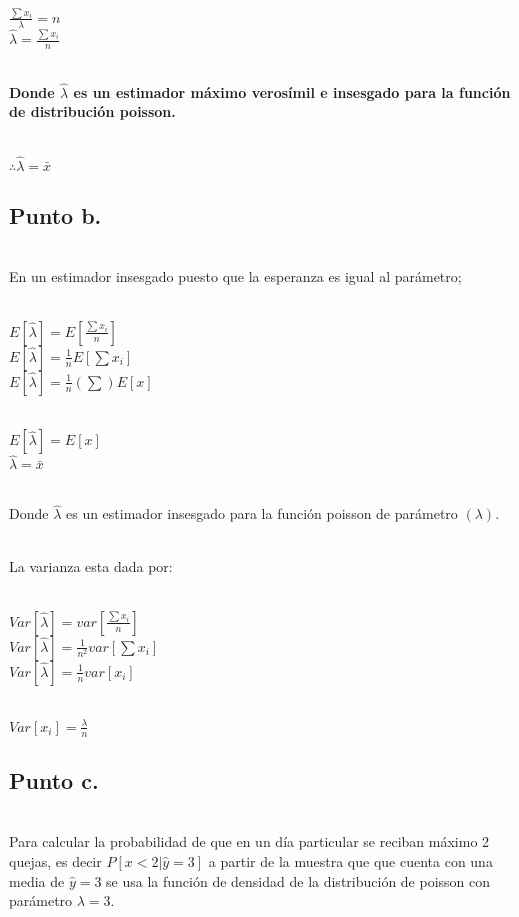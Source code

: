 \documentclass[letterpaper,12pt,onecolumn,titlepage]{article}
\begin{document}
~\\ $\frac{\sum{x_{i}}}{\lambda} = n $
~\\ $\hat{\lambda} = \frac{\sum{x_{i}}}{n}$

~\\ \textbf{Donde $\hat{\lambda}$ es un estimador m\'{a}ximo veros\'{i}mil e insesgado para la funci\'{o}n de distribuci\'{o}n poisson.} 
 
~\\ $\therefore \hat{\lambda} = \bar{x}$

\subsection{Punto b.}
~\\ En un estimador insesgado puesto que la esperanza es igual al par\'{a}metro;

~\\ $E[\hat{\lambda}] = E[\frac{\sum{x_{i}}}{n}]$
~\\ $E[\hat{\lambda}] = \frac{1}{n}E[\sum{x_{i}}]$
~\\ $E[\hat{\lambda}] = \frac{1}{n}(\sum)E[x]$

~\\ $E[\hat{\lambda}] = E[x]$
~\\ $\hat{\lambda} = \bar{x}$

~\\ Donde $\hat{\lambda}$ es un estimador insesgado para la funci\'{o}n poisson de par\'{a}metro $(\lambda)$. 

~\\ La varianza esta dada por: 

~\\ $Var[\hat{\lambda}]= var[\frac{\sum{x_{i}}}{n}]$
~\\ $Var[\hat{\lambda}]= \frac{1}{n^2} var[\sum{x_{i}}]$
~\\ $Var[\hat{\lambda}]= \frac{1}{n} var[x_{i}]$

~\\ $Var[x_{i}]= \frac{\lambda}{n}$

\subsection{Punto c.}
~\\ Para calcular la probabilidad de que en un d\'{i}a particular se reciban m\'{a}ximo 2 quejas, es decir $P[x<2|\hat{y}=3]$ a partir de la muestra que que cuenta con una media de $\hat{y}=3$ se usa la funci\'{o}n de densidad de la distribuci\'{o}n de poisson con par\'{a}metro $\lambda=3$. 
\end{document}
